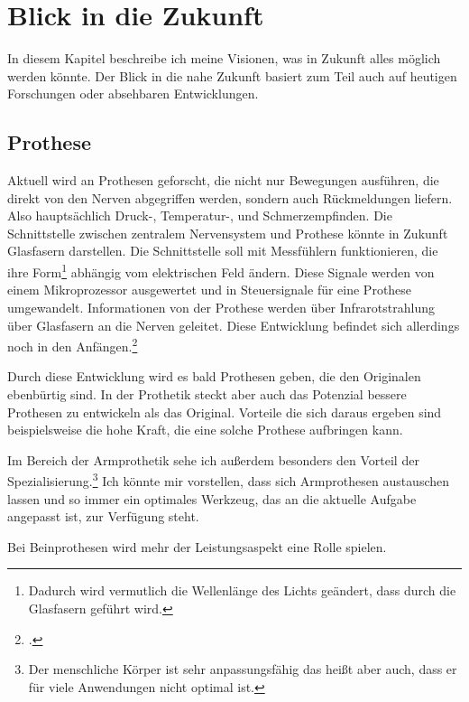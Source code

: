 \section{Blick in die Zukunft}
\label{sec:Robin:future}

In diesem Kapitel beschreibe ich meine Visionen, was in Zukunft alles möglich werden könnte. Der Blick in
die nahe Zukunft basiert zum Teil auch auf heutigen Forschungen oder absehbaren Entwicklungen.

\subsection{Prothese}
Aktuell wird an Prothesen geforscht, die nicht nur Bewegungen ausführen, die direkt von den Nerven
abgegriffen werden, sondern auch Rückmeldungen liefern. Also hauptsächlich \mbox{Druck-,}
\mbox{Temperatur-,} und
Schmerzempfinden. Die Schnittstelle zwischen zentralem Nervensystem und Prothese könnte in Zukunft
Glasfasern darstellen. Die Schnittstelle soll mit Messfühlern funktionieren, die ihre
Form\footnote{Dadurch wird vermutlich die Wellenlänge des Lichts geändert, dass durch die Glasfasern
geführt wird.} abhängig vom elektrischen Feld ändern. Diese Signale werden von einem Mikroprozessor
ausgewertet und in Steuersignale für eine Prothese umgewandelt.
Informationen von der Prothese werden über Infrarotstrahlung über Glasfasern an die Nerven geleitet.
Diese Entwicklung befindet sich allerdings noch in den
Anfängen.\footcite{Spektrum:Weg_zu_intelligenten_Prothesen}

Durch diese Entwicklung wird es bald Prothesen geben, die den Originalen ebenbürtig sind. In der
Prothetik steckt aber auch das Potenzial bessere Prothesen zu entwickeln als das Original. Vorteile
die sich daraus ergeben sind beispielsweise die hohe Kraft, die eine solche Prothese aufbringen kann.

Im Bereich der Armprothetik sehe ich außerdem besonders den Vorteil der Spezialisierung.\footnote{Der
menschliche Körper ist sehr anpassungsfähig das heißt aber auch, dass er für viele Anwendungen nicht
optimal ist.} Ich könnte mir vorstellen, dass sich Armprothesen austauschen lassen und so immer ein
optimales Werkzeug, das an die aktuelle Aufgabe angepasst ist, zur Verfügung steht.

Bei Beinprothesen wird mehr der Leistungsaspekt eine Rolle spielen.


